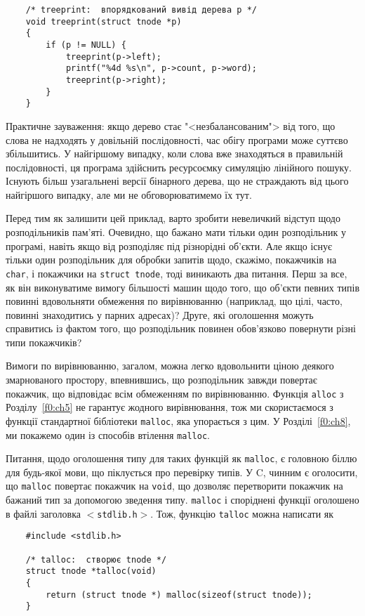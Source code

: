\documentclass[a4paper,12pt]{book}
\begin{document}
  \begin{verbatim}
    /* treeprint:  впорядкований вивід дерева p */
    void treeprint(struct tnode *p)
    {
        if (p != NULL) {
            treeprint(p->left);
            printf("%4d %s\n", p->count, p->word);
            treeprint(p->right);
        }
    }
  \end{verbatim}

  Практичне зауваження: якщо дерево стає "<незбалансованим"> від того, що слова не
  надходять у довільній послідовності, час обігу програми може суттєво збільшитись. У
  найгіршому випадку, коли слова вже знаходяться в правильній послідовності, ця програма
  здійснить ресурсоємку симуляцію лінійного пошуку. Існують більш узагальнені версії
  бінарного дерева, що не страждають від цього найгіршого випадку, але ми не
  обговорюватимемо їх тут.

  Перед тим як залишити цей приклад, варто зробити невеличкий відступ щодо розподільників
  пам'яті. Очевидно, що бажано мати тільки один розподільник у програмі, навіть якщо від
  розподіляє під різнорідні об'єкти. Але якщо існує тільки один розподільник для обробки
  запитів щодо, скажімо, покажчиків на \texttt{char}, і покажчики на \texttt{struct
  tnode}, тоді виникають два питання. Перш за все, як він виконуватиме вимогу
  більшості машин щодо того, що об'єкти певних типів повинні вдовольняти обмеження по
  вирівнюванню (наприклад, що цілі, часто, повинні знаходитись у парних адресах)? Друге,
  які оголошення можуть справитись із фактом того, що розподільник повинен обов'язково
  повернути різні типи покажчиків?

  Вимоги по вирівнюванню, загалом, можна легко вдовольнити ціною деякого змарнованого
  простору, впевнившись, що розподільник завжди повертає покажчик, що відповідає всім
  обмеженням по вирівнюванню. Функція \texttt{alloc} з Розділу~\ref{f0:ch5} не
  гарантує жодного вирівнювання, тож ми скористаємося з функції стандартної бібліотеки
  \texttt{malloc}, яка упорається з цим. У Розділі~\ref{f0:ch8}, ми покажемо один
  із способів втілення \texttt{malloc}.

  Питання, щодо оголошення типу для таких функцій як \texttt{malloc}, є головною біллю для
  будь-якої мови, що піклується про перевірку типів. У C, чинним є оголосити, що
  \texttt{malloc} повертає покажчик на \texttt{void}, що дозволяє перетворити покажчик на
  бажаний тип за допомогою зведення типу. \texttt{malloc} і споріднені функції оголошено в
  файлі заголовка \texttt{\mbox{$<$}stdlib.h\mbox{$>$}}. Тож, функцію \texttt{talloc}
  можна написати як
  \begin{verbatim}
    #include <stdlib.h>

    /* talloc:  створює tnode */
    struct tnode *talloc(void)
    {
        return (struct tnode *) malloc(sizeof(struct tnode));
    }
  \end{verbatim}
\end{document}
